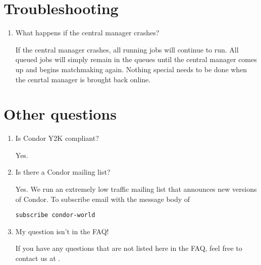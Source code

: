 \section{Troubleshooting}

\begin{enumerate}

\item{What happens if the central manager crashes?} 

If the central manager crashes, all running jobs will continue to
run. All queued jobs will simply remain in the queues until the central
manager comes up and begins matchmaking again.  Nothing special needs
to be done when the cenrtal manager is brought back online. 

\end{enumerate}

\section{Other questions}

\begin{enumerate}

\item Is Condor Y2K compliant?

Yes.

\item Is there a Condor mailing list?

Yes.  We run an extremely low traffic mailing list that announces new versions of Condor.
To subscribe email
with the message body of
\begin{verbatim}
subscribe condor-world
\end{verbatim}

\item My question isn't in the FAQ!

If you have any questions that are not listed here in the FAQ, feel free to contact us at .
\end{enumerate}
